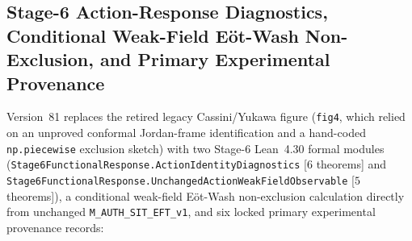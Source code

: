 \subsection{Stage-6 Action-Response Diagnostics, Conditional Weak-Field E\"ot-Wash Non-Exclusion, and Primary Experimental Provenance}
\label{sec:stage6-action-diagnostics}

Version~81 replaces the retired legacy Cassini/Yukawa figure (\texttt{fig4}, which relied on an unproved conformal Jordan-frame identification and a hand-coded \texttt{np.piecewise} exclusion sketch) with two Stage-6 Lean~4.30 formal modules (\texttt{Stage6FunctionalResponse.\allowbreak{}ActionIdentityDiagnostics} [$6$ theorems] and \texttt{Stage6FunctionalResponse.\allowbreak{}UnchangedActionWeakFieldObservable} [$5$ theorems]), a conditional weak-field E\"ot-Wash non-exclusion calculation directly from unchanged \texttt{M\_AUTH\_SIT\_EFT\_v1}, and six locked primary experimental provenance records:
